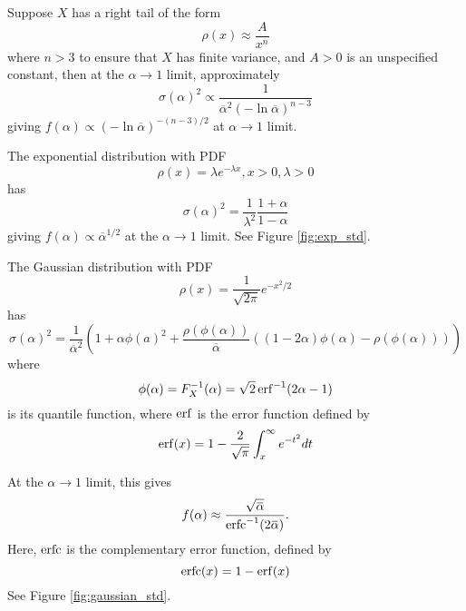 \begin{ex}
	Suppose $X$ has a right tail of the form 
	$$\rho(x) \approx \frac{A}{x^n}$$
	where $n > 3$ to ensure that $X$ has finite variance, and $A> 0$ is an unspecified constant, then at the $\alpha \to 1$ limit, approximately 
	\begin{equation}
	\sigma(\alpha)^2 \propto \frac{1}{{\overbar\alpha}^2 \left(-\ln{\overbar\alpha}\right)^{n-3}}
	\end{equation}
	giving $f(\alpha) \propto \left(-\ln{\overbar\alpha}\right)^{-(n-3)/2}$ at $\alpha \to 1$ limit.
\end{ex}

\begin{ex}
	The exponential distribution with PDF 
	$$\rho(x) = \lambda e^{-\lambda x}, x > 0, \lambda > 0$$
	has 
	\begin{equation}
		\sigma(\alpha)^2 = \frac{1}{\lambda^2}\frac{1+\alpha}{1-\alpha}
	\end{equation}
	giving $f(\alpha) \propto {\overbar\alpha}^{1/2}$ at the $\alpha \to 1$ limit. See Figure \ref{fig:exp_std}.
\end{ex}

\begin{ex}
	The Gaussian distribution with PDF 
	$$\rho(x) = \frac{1}{\sqrt{2\pi}}e^{- x^2/2}$$
	has 
	\begin{equation}
	\sigma(\alpha)^2 = \frac{1}{{\overbar\alpha}^2}
	\left(
		1 + \alpha \phi(a)^2 
		+ \frac{\rho(\phi(\alpha))}{\overbar\alpha}((1 -2\alpha)\phi(\alpha) - \rho(\phi(\alpha)))
	\right)
	\end{equation}
	where 
	$$\phi(\alpha) = F_X^{-1}(\alpha) = \sqrt{2} \operatorname{erf}^{-1}(2\alpha - 1)$$
	is its quantile function, where $\operatorname{erf}$ is the error function defined by 
	\begin{equation}
		\operatorname{erf}(x) = 1- \frac{2}{\sqrt{\pi}} \int_{x}^{\infty} e^{-t^{2}} dt
	\end{equation}
	
	At the $\alpha \to 1$ limit, this gives 
	\begin{equation}
	f(\alpha) \approx \frac{\sqrt{{\overbar\alpha}}}{\erfc^{-1}(2{\overbar\alpha})}.
	\end{equation}
	Here, $\operatorname{erfc}$ is the complementary error function, defined by 
	\begin{equation}
	\operatorname{erfc}(x) = 1- \operatorname{erf}(x)
	\end{equation}
	 See Figure \ref{fig:gaussian_std}.
\end{ex}

